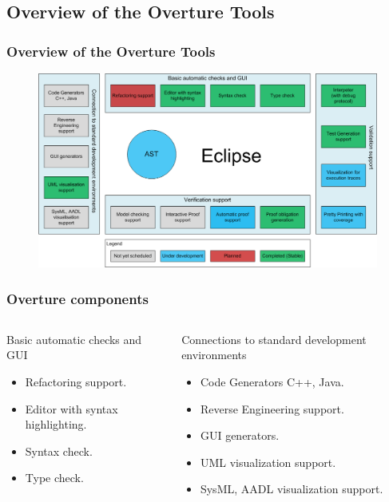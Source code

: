 \documentclass[slidestop,uncompress,mathserif,final]{beamer}
\begin{document}
\subsection{Overview of the Overture Tools}
\frame
{
  \frametitle{Overview of the Overture Tools}

\begin{figure}[t]
\centering
\includegraphics[width=\textwidth]{images/OvertureOverview}
\label{fig:}
\end{figure}

}

\begin{frame}
	\frametitle{Overture components}
	\begin{columns}
			\begin{block}{Basic automatic checks and GUI}
				{\scriptsize\begin{itemize}
				  \item Refactoring support.
				  \item Editor with syntax highlighting.
				  \item Syntax check.      
				  \item Type check.
				\end{itemize}}
			\end{block}
			\begin{block}{Connections to standard development environments}
				{\scriptsize\begin{itemize}
			  \item Code Generators C++, Java.
			  \item Reverse Engineering support.
			  \item GUI generators.      
			  \item UML visualization support.
			  \item SysML, AADL visualization support.
				\end{itemize}}
			\end{block}
	\end{columns}
\end{frame}
\end{document}
